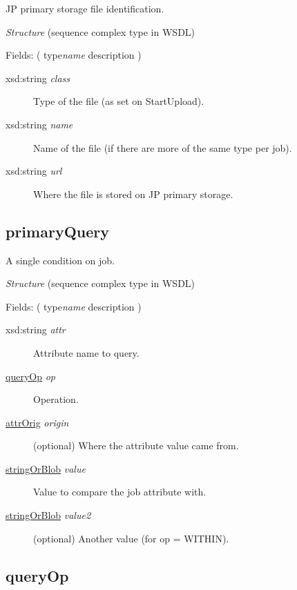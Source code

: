 JP primary storage file identification.

{\em{Structure}} (sequence complex type in WSDL)

Fields: ( type{\ttfamily\itshape{{name}}} description )

\begin{description}
\item[{xsd:string {\ttfamily\itshape{{class}}}}]\null{}
Type of the file (as set on StartUpload).
\item[{xsd:string {\ttfamily\itshape{{name}}}}]\null{}
Name of the file (if there are more of the same type per job).
\item[{xsd:string {\ttfamily\itshape{{url}}}}]\null{}
Where the file is stored on JP primary storage.
\end{description}
\noindent \subsection{primaryQuery}
\label{type:primaryQuery}\hypertarget{type:primaryQuery}{}%

A single condition on job.

{\em{Structure}} (sequence complex type in WSDL)

Fields: ( type{\ttfamily\itshape{{name}}} description )

\begin{description}
\item[{xsd:string {\ttfamily\itshape{{attr}}}}]\null{}
Attribute name to query.
\item[{\hyperlink{type:queryOp}{queryOp} {\ttfamily\itshape{{op}}}}]\null{}
Operation.
\item[{\hyperlink{type:attrOrig}{attrOrig} {\ttfamily\itshape{{origin}}}}]\null{}
(optional) Where the attribute value came from.
\item[{\hyperlink{type:stringOrBlob}{stringOrBlob} {\ttfamily\itshape{{value}}}}]\null{}
Value to compare the job attribute with.
\item[{\hyperlink{type:stringOrBlob}{stringOrBlob} {\ttfamily\itshape{{value2}}}}]\null{}
(optional) Another value (for op = WITHIN).
\end{description}
\noindent \subsection{queryOp}
\label{type:queryOp}\hypertarget{type:queryOp}{}%

